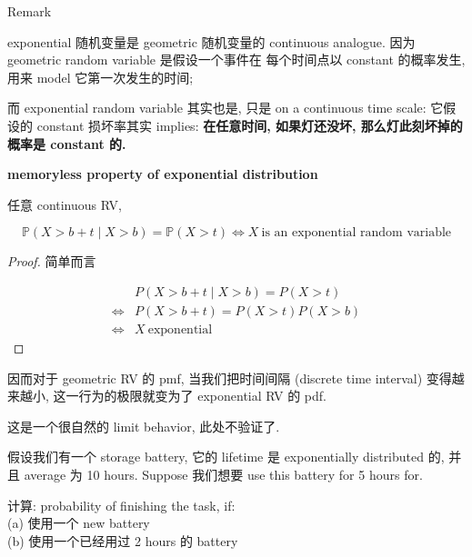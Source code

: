\documentclass{qlnotes-export}
\begin{document}
\begin{qlremark}{Remark}

exponential 随机变量是 geometric 随机变量的 continuous analogue. 因为 geometric random variable 是假设一个事件在 每个时间点以 constant 的概率发生, 用来 model 它第一次发生的时间;

而 exponential random variable 其实也是, 只是 on a continuous time scale: 它假设的 constant 损坏率其实 implies: \textbf{在任意时间, 如果灯还没坏, 那么灯此刻坏掉的概率是 constant 的.}

\begin{theorem}{\protect{}\label{kn-memoryless-property-of-exponential-distribution}{\textbf{memoryless
property of exponential distribution}}}

任意 continuous RV,

\[{\mathbb{P}}(X > b + t \mid X > b) = {\mathbb{P}}(X > t)\Leftrightarrow X\ \text{is an exponential random variable}\]

\end{theorem}

\begin{proof}

简单而言

\[\begin{matrix}
 & {P(X > b + t \mid X > b) = P(X > t)} \\
\Leftrightarrow & {P(X > b + t) = P(X > t)P(X > b)} \\
\Leftrightarrow & {X\ \text{exponential}}
\end{matrix}\]

\end{proof}

因而对于 geometric RV 的 pmf, 当我们把时间间隔 (discrete time interval) 变得越来越小, 这一行为的极限就变为了 exponential RV 的 pdf.

这是一个很自然的 limit behavior, 此处不验证了.

\end{qlremark}

\begin{example}

假设我们有一个 storage battery, 它的 lifetime 是 exponentially distributed 的, 并且 average 为 10 hours. Suppose 我们想要 use this battery for 5 hours for.

计算: probability of finishing the task, if:\\
(a) 使用一个 new battery\\
(b) 使用一个已经用过 2 hours 的 battery\\

\end{example}
\end{document}
